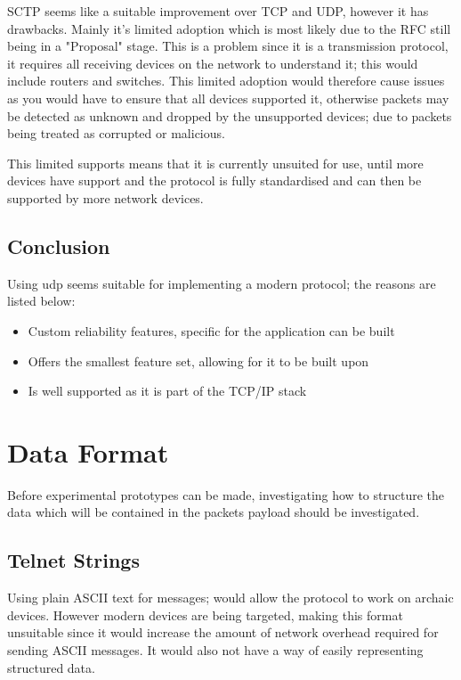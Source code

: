 SCTP seems like a suitable improvement over TCP and UDP, however it has drawbacks. Mainly it's limited adoption which is most likely due to the RFC still being in a "Proposal" stage. This is a problem since it is a transmission protocol, it requires all receiving devices on the network to understand it; this would include routers and switches. This limited adoption would therefore cause issues as you would have to ensure that all devices supported it, otherwise packets may be detected as unknown and dropped by the unsupported devices; due to packets being treated as corrupted or malicious.

This limited supports means that it is currently unsuited for use, until more devices have support and the protocol is fully standardised and can then be supported by more network devices.

\subsection*{Conclusion}
Using \acrshort{udp} seems suitable for implementing a modern protocol; the reasons are listed below:

\begin{itemize}
    \item Custom reliability features, specific for the application can be built
    \item Offers the smallest feature set, allowing for it to be built upon
    \item Is well supported as it is part of the TCP/IP stack
\end{itemize}


\section{Data Format}
Before experimental prototypes can be made, investigating how to structure the data which will be contained in the packets payload should be investigated.

\subsection*{Telnet Strings}
Using plain ASCII text for messages; would allow the protocol to work on archaic devices. However modern devices are being targeted, making this format unsuitable since it would increase the amount of network overhead required for sending ASCII messages. It would also not have a way of easily representing structured data.


